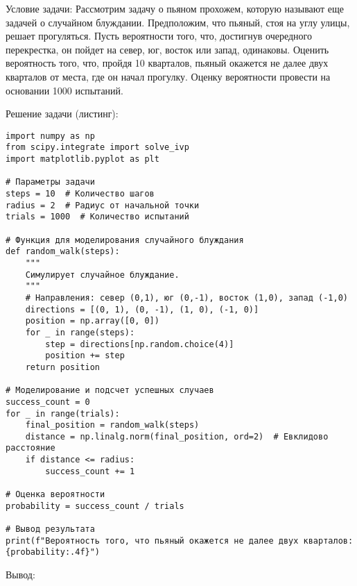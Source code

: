 Условие задачи: Рассмотрим задачу о пьяном прохожем, которую называют еще задачей о случайном блуждании. Предположим, что пьяный, стоя на углу улицы, решает прогуляться. Пусть вероятности того, что, достигнув очередного перекрестка, он пойдет на север, юг, восток или запад, одинаковы. Оценить вероятность того, что, пройдя 10 кварталов, пьяный окажется не далее двух кварталов от места, где он начал прогулку. Оценку вероятности провести на основании 1000 испытаний.

Решение задачи (листинг):

\begin{verbatim}
import numpy as np
from scipy.integrate import solve_ivp
import matplotlib.pyplot as plt

# Параметры задачи
steps = 10  # Количество шагов
radius = 2  # Радиус от начальной точки
trials = 1000  # Количество испытаний

# Функция для моделирования случайного блуждания
def random_walk(steps):
    """
    Симулирует случайное блуждание.
    """
    # Направления: север (0,1), юг (0,-1), восток (1,0), запад (-1,0)
    directions = [(0, 1), (0, -1), (1, 0), (-1, 0)]
    position = np.array([0, 0])
    for _ in range(steps):
        step = directions[np.random.choice(4)]
        position += step
    return position

# Моделирование и подсчет успешных случаев
success_count = 0
for _ in range(trials):
    final_position = random_walk(steps)
    distance = np.linalg.norm(final_position, ord=2)  # Евклидово расстояние
    if distance <= radius:
        success_count += 1

# Оценка вероятности
probability = success_count / trials

# Вывод результата
print(f"Вероятность того, что пьяный окажется не далее двух кварталов: {probability:.4f}")
\end{verbatim}

Вывод:
